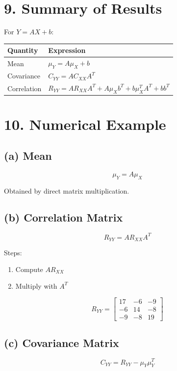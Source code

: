\documentclass{article}
\begin{document}
\section*{9. Summary of Results}

For $Y = AX + b$:

\begin{center}
\begin{tabular}{ll}
\toprule
Quantity & Expression \\
\midrule
Mean & $\mu_Y = A\mu_X + b$ \\
Covariance & $C_{YY} = A C_{XX} A^T$ \\
Correlation & $R_{YY} = A R_{XX} A^T + A\mu_X b^T + b\mu_X^T A^T + bb^T$ \\
\bottomrule
\end{tabular}
\end{center}

\section*{10. Numerical Example}

\subsection*{(a) Mean}
\[
\mu_Y = A\mu_X
\]

Obtained by direct matrix multiplication.

\subsection*{(b) Correlation Matrix}
\[
R_{YY} = A R_{XX} A^T
\]

Steps:
\begin{enumerate}
\item Compute $AR_{XX}$
\item Multiply with $A^T$
\end{enumerate}

\[
R_{YY} =
\begin{bmatrix}
17 & -6 & -9 \\
-6 & 14 & -8 \\
-9 & -8 & 19
\end{bmatrix}
\]

\subsection*{(c) Covariance Matrix}
\[
C_{YY} = R_{YY} - \mu_Y \mu_Y^T
\]
\end{document}
